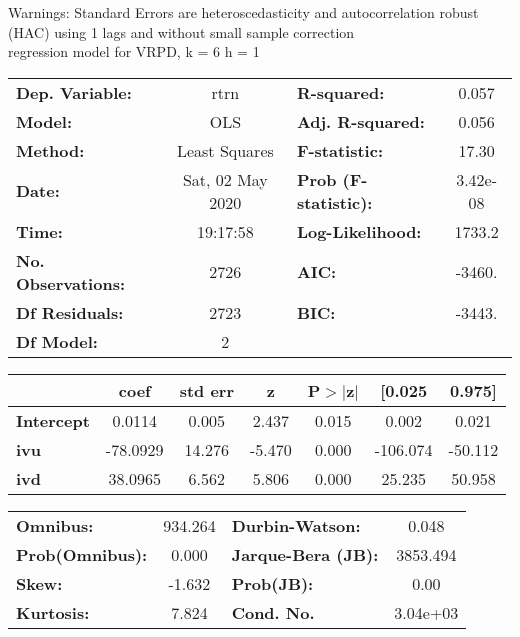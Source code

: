 Warnings: \newline
 [1] Standard Errors are heteroscedasticity and autocorrelation robust (HAC) using 1 lags and without small sample correction\\ 

regression model for VRPD, k = 6 h = 1\begin{center}
\begin{tabular}{lclc}
\toprule
\textbf{Dep. Variable:}    &       rtrn       & \textbf{  R-squared:         } &     0.057   \\
\textbf{Model:}            &       OLS        & \textbf{  Adj. R-squared:    } &     0.056   \\
\textbf{Method:}           &  Least Squares   & \textbf{  F-statistic:       } &     17.30   \\
\textbf{Date:}             & Sat, 02 May 2020 & \textbf{  Prob (F-statistic):} &  3.42e-08   \\
\textbf{Time:}             &     19:17:58     & \textbf{  Log-Likelihood:    } &    1733.2   \\
\textbf{No. Observations:} &        2726      & \textbf{  AIC:               } &    -3460.   \\
\textbf{Df Residuals:}     &        2723      & \textbf{  BIC:               } &    -3443.   \\
\textbf{Df Model:}         &           2      & \textbf{                     } &             \\
\bottomrule
\end{tabular}
\begin{tabular}{lcccccc}
                   & \textbf{coef} & \textbf{std err} & \textbf{z} & \textbf{P$> |$z$|$} & \textbf{[0.025} & \textbf{0.975]}  \\
\midrule
\textbf{Intercept} &       0.0114  &        0.005     &     2.437  &         0.015        &        0.002    &        0.021     \\
\textbf{ivu}       &     -78.0929  &       14.276     &    -5.470  &         0.000        &     -106.074    &      -50.112     \\
\textbf{ivd}       &      38.0965  &        6.562     &     5.806  &         0.000        &       25.235    &       50.958     \\
\bottomrule
\end{tabular}
\begin{tabular}{lclc}
\textbf{Omnibus:}       & 934.264 & \textbf{  Durbin-Watson:     } &    0.048  \\
\textbf{Prob(Omnibus):} &   0.000 & \textbf{  Jarque-Bera (JB):  } & 3853.494  \\
\textbf{Skew:}          &  -1.632 & \textbf{  Prob(JB):          } &     0.00  \\
\textbf{Kurtosis:}      &   7.824 & \textbf{  Cond. No.          } & 3.04e+03  \\
\bottomrule
\end{tabular}
\end{center}

